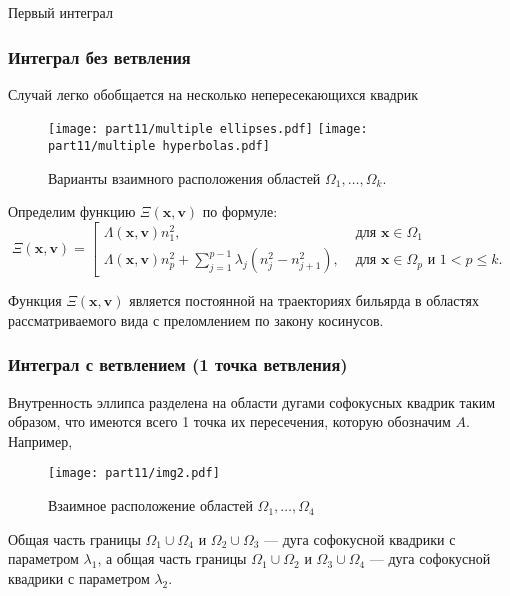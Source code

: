\begin{frame}
\center\LARGE Первый интеграл
\end{frame}


\begin{frame}\frametitle{Интеграл без ветвления}

\qq Случай легко обобщается на несколько непересекающихся квадрик

\begin{figure}[!htb]
    \centering
    \texttt{[image: part11/multiple ellipses.pdf]}
    \texttt{[image: part11/multiple hyperbolas.pdf]}  
    \caption{Варианты взаимного расположения областей $\Omega_1, \ldots, \Omega_k$.}
\end{figure}
%


\qq Определим функцию $\Xi(\mathbf{x}, \mathbf{v})$ по формуле: 
\begin{equation*}
\Xi(\mathbf{x}, \mathbf{v}) = \left[
\begin{array}{ll}
    \Lambda(\mathbf{x}, \mathbf{v}) n_1^2, &  \text{ для } \mathbf{x} \in \Omega_1 
    \\
    \Lambda(\mathbf{x}, \mathbf{v}) n_p^2 + 
    \sum_{j=1}^{p-1} \lambda_j(n_j^2-n_{j+1}^2), & \text{ для } \mathbf{x} \in \Omega_p \text{ и } 1 < p \leq k. 
\end{array}
\right.
\end{equation*}

\begin{mytheorem}
Функция $\Xi(\mathbf{x}, \mathbf{v})$ является постоянной на траекториях бильярда в областях рассматриваемого вида с  преломлением по закону косинусов.
\end{mytheorem}
\end{frame}


\begin{frame}\frametitle{Интеграл с ветвлением (1 точка ветвления)}

\qq 
Внутренность эллипса разделена на области дугами софокусных квадрик таким образом, что имеются всего 1 точка их пересечения, которую обозначим $A$. Например,
\begin{figure}[!htb]
\centering
\texttt{[image: part11/img2.pdf]}
\caption{Взаимное расположение областей $\Omega_1,\ldots,\Omega_4$}
\label{fig:xi_is_integral}
\end{figure}

\qq Общая часть границы $\Omega_1 \cup \Omega_4$ и $\Omega_2 \cup \Omega_3$ --- дуга софокусной квадрики с параметром $\lambda_1$, а общая часть границы $\Omega_1 \cup \Omega_2$ и $\Omega_3 \cup \Omega_4$ --- дуга софокусной квадрики с параметром $\lambda_2$.
\end{frame}

